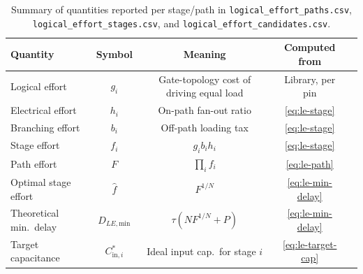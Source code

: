 \begin{table}[H]
\centering
\small
\begin{tabular}{@{}lcccc@{}}
\toprule
\textbf{Quantity} & \textbf{Symbol} & \textbf{Meaning} & \textbf{Computed from} \\
\midrule
Logical effort & $g_i$ & Gate-topology cost of driving equal load & Library, per pin \\
Electrical effort & $h_i$ & On-path fan-out ratio & \cref{eq:le-stage} \\
Branching effort & $b_i$ & Off-path loading tax & \cref{eq:le-stage} \\
Stage effort & $f_i$ & $g_i b_i h_i$ & \cref{eq:le-stage} \\
Path effort & $F$ & $\prod_i f_i$ & \cref{eq:le-path} \\
Optimal stage effort & $\hat f$ & $F^{1/N}$ & \cref{eq:le-min-delay} \\
Theoretical min.\ delay & $D_{LE,\mathrm{min}}$ & $\tau(NF^{1/N}+P)$ & \cref{eq:le-min-delay} \\
Target capacitance & $C^{*}_{\mathrm{in},i}$ & Ideal input cap.\ for stage $i$ & \cref{eq:le-target-cap} \\
\bottomrule
\end{tabular}
\caption{Summary of quantities reported per stage/path in
\texttt{logical\_effort\_paths.csv}, \texttt{logical\_effort\_stages.csv},
and \texttt{logical\_effort\_candidates.csv}.}
\label{tab:le-summary}
\end{table}
